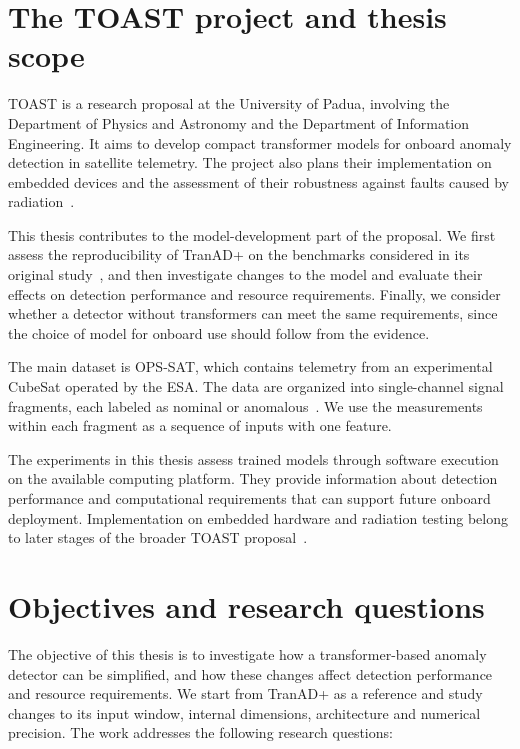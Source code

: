 \section{The TOAST project and thesis scope}
\label{sec:introduction-toast}

\ac{TOAST} is a research proposal at the University of Padua, involving
the Department of Physics and Astronomy and the Department of Information
Engineering. It aims to develop compact transformer models for onboard
anomaly detection in satellite telemetry. The project also plans their
implementation on embedded devices and the assessment of their robustness
against faults caused by radiation~\cite{TOASTExecutiveSummary}.

This thesis contributes to the model-development part of the proposal.
We first assess the reproducibility of TranAD+ on the benchmarks
considered in its original study~\cite{Yermakov2025TranADPlus},
and then investigate changes to the model and evaluate their effects
on detection performance and resource requirements. Finally, we consider
whether a detector without transformers can meet the same requirements,
since the choice of model for onboard use should follow from the evidence.

The main dataset is \ac{OPS-SAT}, which contains telemetry from an
experimental CubeSat operated by the \ac{ESA}. The data are organized
into single-channel signal fragments, each labeled as nominal or
anomalous~\cite{Ruszczak2025OPSSAT}. We use the measurements
within each fragment as a sequence of inputs with one feature.

The experiments in this thesis assess trained models through software
execution on the available computing platform. They provide information
about detection performance and computational requirements that can
support future onboard deployment. Implementation on embedded hardware
and radiation testing belong to later stages of the broader
\ac{TOAST} proposal~\cite{TOASTExecutiveSummary}.

\section{Objectives and research questions}
\label{sec:introduction-questions}

The objective of this thesis is to investigate how a transformer-based
anomaly detector can be simplified, and how these changes affect detection
performance and resource requirements. We start from TranAD+ as a reference
and study changes to its input window, internal dimensions, architecture
and numerical precision. The work addresses the following research questions:

